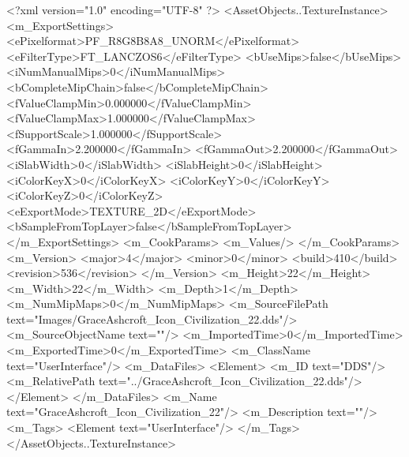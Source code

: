 <?xml version="1.0" encoding="UTF-8" ?>
<AssetObjects..TextureInstance>
	<m_ExportSettings>
		<ePixelformat>PF_R8G8B8A8_UNORM</ePixelformat>
		<eFilterType>FT_LANCZOS6</eFilterType>
		<bUseMips>false</bUseMips>
		<iNumManualMips>0</iNumManualMips>
		<bCompleteMipChain>false</bCompleteMipChain>
		<fValueClampMin>0.000000</fValueClampMin>
		<fValueClampMax>1.000000</fValueClampMax>
		<fSupportScale>1.000000</fSupportScale>
		<fGammaIn>2.200000</fGammaIn>
		<fGammaOut>2.200000</fGammaOut>
		<iSlabWidth>0</iSlabWidth>
		<iSlabHeight>0</iSlabHeight>
		<iColorKeyX>0</iColorKeyX>
		<iColorKeyY>0</iColorKeyY>
		<iColorKeyZ>0</iColorKeyZ>
		<eExportMode>TEXTURE_2D</eExportMode>
		<bSampleFromTopLayer>false</bSampleFromTopLayer>
	</m_ExportSettings>
	<m_CookParams>
		<m_Values/>
	</m_CookParams>
	<m_Version>
		<major>4</major>
		<minor>0</minor>
		<build>410</build>
		<revision>536</revision>
	</m_Version>
	<m_Height>22</m_Height>
	<m_Width>22</m_Width>
	<m_Depth>1</m_Depth>
	<m_NumMipMaps>0</m_NumMipMaps>
	<m_SourceFilePath text="Images/GraceAshcroft_Icon_Civilization_22.dds"/>
	<m_SourceObjectName text=""/>
	<m_ImportedTime>0</m_ImportedTime>
	<m_ExportedTime>0</m_ExportedTime>
	<m_ClassName text="UserInterface"/>
	<m_DataFiles>
		<Element>
			<m_ID text="DDS"/>
			<m_RelativePath text="../GraceAshcroft_Icon_Civilization_22.dds"/>
		</Element>
	</m_DataFiles>
	<m_Name text="GraceAshcroft_Icon_Civilization_22"/>
	<m_Description text=""/>
	<m_Tags>
		<Element text="UserInterface"/>
	</m_Tags>
</AssetObjects..TextureInstance>
